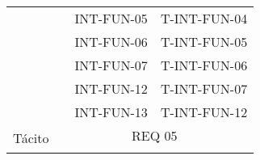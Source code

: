\begin{table}[H]
\begin{tabular}{|l|llc|}
                                                       & \multicolumn{1}{l|}{}                                                                                                                                                                                                                             & \multicolumn{1}{l|}{INT-FUN-05}                  & T-INT-FUN-04                                       \\
                                                       & \multicolumn{1}{l|}{}                                                                                                                                                                                                                             & \multicolumn{1}{l|}{INT-FUN-06}                  & T-INT-FUN-05                                       \\
                                                       & \multicolumn{1}{l|}{}                                                                                                                                                                                                                             & \multicolumn{1}{l|}{INT-FUN-07}                  & T-INT-FUN-06                                       \\
                                                       & \multicolumn{1}{l|}{}                                                                                                                                                                                                                             & \multicolumn{1}{l|}{INT-FUN-12}                  & T-INT-FUN-07                                       \\
                                                       & \multicolumn{1}{l|}{}                                                                                                                                                                                                                             & \multicolumn{1}{l|}{INT-FUN-13}                  & T-INT-FUN-12                                       \\ \hline
\multirow{3}{*}{Tácito}                                & \multicolumn{3}{c|}{REQ 05}                                                                                                                                                                                                                                                                                                                               \\ \cline{2-4} 

\end{tabular}
\end{table}
